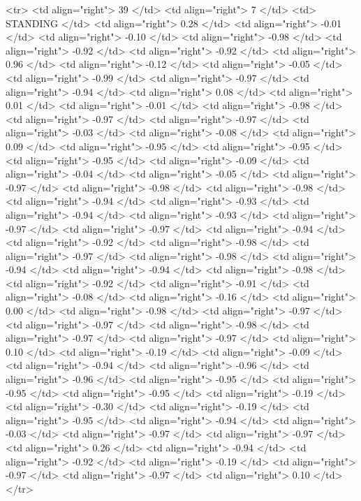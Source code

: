   <tr> <td align="right"> 39 </td> <td align="right">   7 </td> <td> STANDING </td> <td align="right"> 0.28 </td> <td align="right"> -0.01 </td> <td align="right"> -0.10 </td> <td align="right"> -0.98 </td> <td align="right"> -0.92 </td> <td align="right"> -0.92 </td> <td align="right"> 0.96 </td> <td align="right"> -0.12 </td> <td align="right"> -0.05 </td> <td align="right"> -0.99 </td> <td align="right"> -0.97 </td> <td align="right"> -0.94 </td> <td align="right"> 0.08 </td> <td align="right"> 0.01 </td> <td align="right"> -0.01 </td> <td align="right"> -0.98 </td> <td align="right"> -0.97 </td> <td align="right"> -0.97 </td> <td align="right"> -0.03 </td> <td align="right"> -0.08 </td> <td align="right"> 0.09 </td> <td align="right"> -0.95 </td> <td align="right"> -0.95 </td> <td align="right"> -0.95 </td> <td align="right"> -0.09 </td> <td align="right"> -0.04 </td> <td align="right"> -0.05 </td> <td align="right"> -0.97 </td> <td align="right"> -0.98 </td> <td align="right"> -0.98 </td> <td align="right"> -0.94 </td> <td align="right"> -0.93 </td> <td align="right"> -0.94 </td> <td align="right"> -0.93 </td> <td align="right"> -0.97 </td> <td align="right"> -0.97 </td> <td align="right"> -0.94 </td> <td align="right"> -0.92 </td> <td align="right"> -0.98 </td> <td align="right"> -0.97 </td> <td align="right"> -0.98 </td> <td align="right"> -0.94 </td> <td align="right"> -0.94 </td> <td align="right"> -0.98 </td> <td align="right"> -0.92 </td> <td align="right"> -0.91 </td> <td align="right"> -0.08 </td> <td align="right"> -0.16 </td> <td align="right"> 0.00 </td> <td align="right"> -0.98 </td> <td align="right"> -0.97 </td> <td align="right"> -0.97 </td> <td align="right"> -0.98 </td> <td align="right"> -0.97 </td> <td align="right"> -0.97 </td> <td align="right"> 0.10 </td> <td align="right"> -0.19 </td> <td align="right"> -0.09 </td> <td align="right"> -0.94 </td> <td align="right"> -0.96 </td> <td align="right"> -0.96 </td> <td align="right"> -0.95 </td> <td align="right"> -0.95 </td> <td align="right"> -0.95 </td> <td align="right"> -0.19 </td> <td align="right"> -0.30 </td> <td align="right"> -0.19 </td> <td align="right"> -0.95 </td> <td align="right"> -0.94 </td> <td align="right"> -0.03 </td> <td align="right"> -0.97 </td> <td align="right"> -0.97 </td> <td align="right"> 0.26 </td> <td align="right"> -0.94 </td> <td align="right"> -0.92 </td> <td align="right"> -0.19 </td> <td align="right"> -0.97 </td> <td align="right"> -0.97 </td> <td align="right"> 0.10 </td> </tr>
